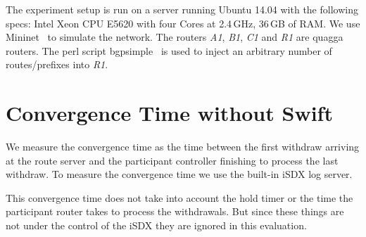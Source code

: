 The experiment setup is run on a server running Ubuntu 14.04 with the following specs: Intel Xeon CPU E5620 with four Cores at 2.4\,GHz, 36\,GB of RAM. We use Mininet~\cite{mininet} to simulate the network. The routers \emph{A1}, \emph{B1}, \emph{C1} and \emph{R1} are quagga~\cite{quagga} routers. The perl script bgpsimple~\cite{bgpsimple} is used to inject an arbitrary number of routes/prefixes into \emph{R1}. 

\section{\label{chapter5:Convergence time without Swift}Convergence Time without Swift}

We measure the convergence time as the time between the first withdraw arriving at the route server and the participant controller finishing to process the last withdraw. To measure the convergence time we use the built-in iSDX log server.

This convergence time does not take into account the hold timer or the time the participant router takes to process the withdrawals. But since these things are not under the control of the iSDX they are ignored in this evaluation.


